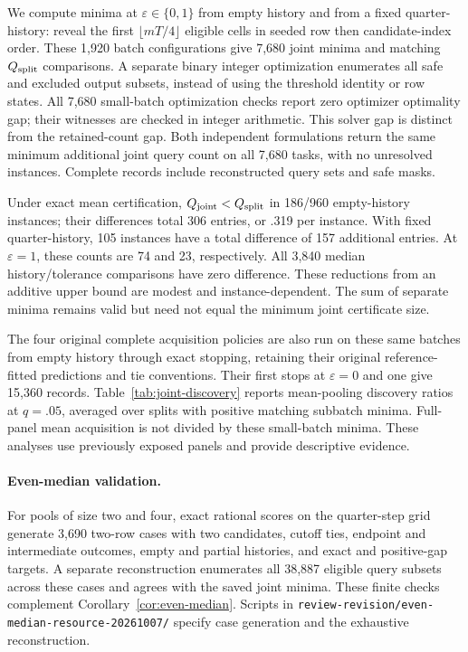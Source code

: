 We compute minima at $\varepsilon\in\{0,1\}$ from empty history and from a fixed quarter-history: reveal the first $\lfloor mT/4\rfloor$ eligible cells in seeded row then candidate-index order. These 1,920 batch configurations give 7,680 joint minima and matching $Q_{\rm split}$ comparisons. A separate binary integer optimization enumerates all safe and excluded output subsets, instead of using the threshold identity or row states. All 7,680 small-batch optimization checks report zero optimizer optimality gap; their witnesses are checked in integer arithmetic. This solver gap is distinct from the retained-count gap. Both independent formulations return the same minimum additional joint query count on all 7,680 tasks, with no unresolved instances. Complete records include reconstructed query sets and safe masks.

Under exact mean certification, $Q_{\rm joint}<Q_{\rm split}$ in 186/960 empty-history instances; their differences total 306 entries, or .319 per instance. With fixed quarter-history, 105 instances have a total difference of 157 additional entries. At $\varepsilon=1$, these counts are 74 and 23, respectively. All 3,840 median history/tolerance comparisons have zero difference. These reductions from an additive upper bound are modest and instance-dependent. The sum of separate minima remains valid but need not equal the minimum joint certificate size.



The four original complete acquisition policies are also run on these same batches from empty history through exact stopping, retaining their original reference-fitted predictions and tie conventions. Their first stops at $\varepsilon=0$ and one give 15,360 records. Table~\ref{tab:joint-discovery} reports mean-pooling discovery ratios at $q=.05$, averaged over splits with positive matching subbatch minima. Full-panel mean acquisition is not divided by these small-batch minima. These analyses use previously exposed panels and provide descriptive evidence.


\paragraph{Even-median validation.}
For pools of size two and four, exact rational scores on the quarter-step grid generate 3,690 two-row cases with two candidates, cutoff ties, endpoint and intermediate outcomes, empty and partial histories, and exact and positive-gap targets. A separate reconstruction enumerates all 38,887 eligible query subsets across these cases and agrees with the saved joint minima. These finite checks complement Corollary~\ref{cor:even-median}. Scripts in \nolinkurl{review-revision/even-median-resource-20261007/} specify case generation and the exhaustive reconstruction.

